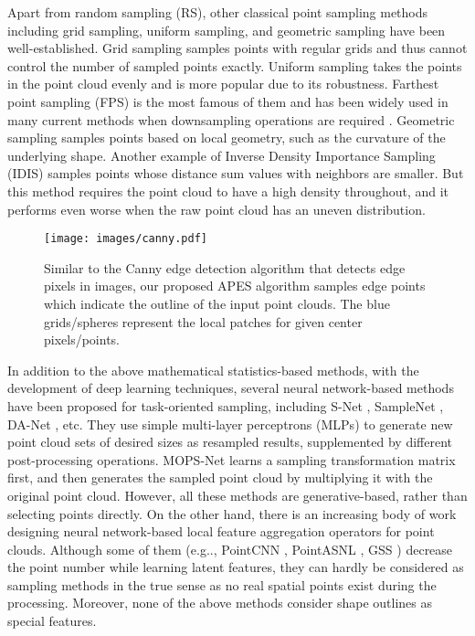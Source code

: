 \documentclass[10pt,twocolumn,letterpaper]{article}
\makeatletter
\DeclareRobustCommand\onedot{\futurelet\@let@token\@onedot}
\def\@onedot{\ifx\@let@token.\else.\null\fi\xspace}
\def\eg{e.g\onedot} \def\Eg{E.g\onedot}
\makeatother
\begin{document}
Apart from random sampling (RS), other classical point sampling methods including grid sampling, uniform sampling, and geometric sampling have been well-established. 
Grid sampling samples points with regular grids and thus cannot control the number of sampled points exactly.
Uniform sampling takes the points in the point cloud evenly and is more popular due to its robustness. Farthest point sampling (FPS) \cite{Eldar1994TheFP, Moenning2003FastMF} is the most famous of them and has been widely used in many current methods when downsampling operations are required \cite{Qi2017PointNetDH, Yu2018PUNetPC, Li2018PointCNNCO, Wu2019PointConvDC, Yan2020PointASNLRP}.
Geometric sampling samples points based on local geometry, such as the curvature of the underlying shape.
Another example of Inverse Density Importance Sampling (IDIS)\cite{Groh2018FlexConvolutionM} samples points whose distance sum values with neighbors are smaller. But this method requires the point cloud to have a high density throughout, and it performs even worse when the raw point cloud has an uneven distribution. 

\begin{figure}[t]
    \centering
    \texttt{[image: images/canny.pdf]}
    \caption{Similar to the Canny edge detection algorithm that detects edge pixels in images, our proposed APES algorithm samples edge points which indicate the outline of the input point clouds. The blue grids/spheres represent the local patches for given center pixels/points.}
    \label{fig:canny}
\end{figure}

In addition to the above mathematical statistics-based methods, with the development of deep learning techniques, several neural network-based methods have been proposed for task-oriented sampling, including S-Net \cite{Dovrat2019LearningTS}, SampleNet \cite{Lang2020SampleNetDP}, DA-Net \cite{Lin2021DANetDD}, etc. They use simple multi-layer perceptrons (MLPs) to generate new point cloud sets of desired sizes as resampled results, supplemented by different post-processing operations. MOPS-Net \cite{Qian2020MOPSNetAM} learns a sampling transformation matrix first, and then generates the sampled point cloud by multiplying it with the original point cloud. However, all these methods are generative-based, rather than selecting points directly. 
On the other hand, there is an increasing body of work designing neural network-based local feature aggregation operators for point clouds. Although some of them (\eg, PointCNN \cite{Li2018PointCNNCO}, PointASNL \cite{Yan2020PointASNLRP}, GSS \cite{Yang2019ModelingPC}) decrease the point number while learning latent features, they can hardly be considered as sampling methods in the true sense as no real spatial points exist during the processing. Moreover, none of the above methods consider shape outlines as special features.
\end{document}
